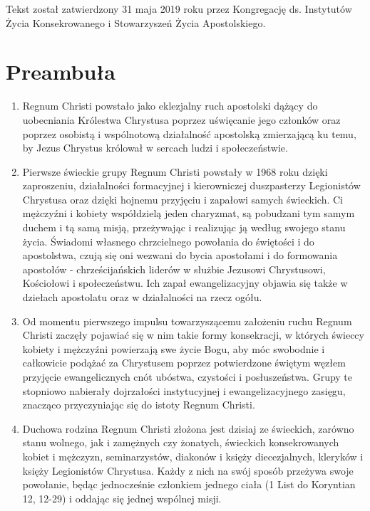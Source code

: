 ﻿\vfill


Tekst został zatwierdzony 31 maja 2019 roku przez Kongregację ds. Instytutów Życia Konsekrowanego i Stowarzyszeń Życia Apostolskiego.


\newpage




\section*{Preambuła}
\begin{enumerate}


\item Regnum Christi powstało jako eklezjalny ruch apostolski dążący do uobecniania Królestwa Chrystusa poprzez uświęcanie jego członków oraz poprzez osobistą i wspólnotową działalność apostolską zmierzającą ku temu, by Jezus Chrystus królował w sercach ludzi i społeczeństwie. 


\item Pierwsze świeckie grupy Regnum Christi powstały w 1968 roku dzięki zaproszeniu, działalności formacyjnej i kierowniczej duszpasterzy Legionistów Chrystusa oraz dzięki hojnemu przyjęciu i zapałowi samych świeckich. Ci mężczyźni i kobiety współdzielą jeden charyzmat, są pobudzani tym samym duchem i tą samą misją, przeżywając i realizując ją według swojego stanu życia. Świadomi własnego chrzcielnego powołania do świętości i do apostolstwa, czują się oni wezwani do bycia apostołami i do formowania apostołów - chrześcijańskich liderów w służbie Jezusowi Chrystusowi, Kościołowi i społeczeństwu. Ich zapał ewangelizacyjny objawia się także w dziełach apostolatu oraz w działalności na rzecz ogółu.


\item Od momentu pierwszego impulsu towarzyszącemu założeniu ruchu Regnum Christi zaczęły pojawiać się w nim takie formy konsekracji, w których świeccy kobiety i mężczyźni powierzają swe życie Bogu, aby móc swobodnie i całkowicie podążać za Chrystusem poprzez potwierdzone świętym węzłem przyjęcie ewangelicznych cnót ubóstwa, czystości i posłuszeństwa. Grupy te stopniowo nabierały dojrzałości instytucyjnej i ewangelizacyjnego zasięgu, znacząco przyczyniając się do istoty Regnum Christi.


\item Duchowa rodzina Regnum Christi złożona jest dzisiaj ze świeckich, zarówno stanu wolnego, jak i zamężnych czy żonatych, świeckich konsekrowanych kobiet i mężczyzn, seminarzystów, diakonów i księży diecezjalnych, kleryków i księży Legionistów Chrystusa. Każdy z nich na swój sposób przeżywa swoje powołanie, będąc jednocześnie członkiem jednego ciała (1 List do Koryntian 12, 12-29) i oddając się jednej wspólnej misji.



\end{enumerate}
